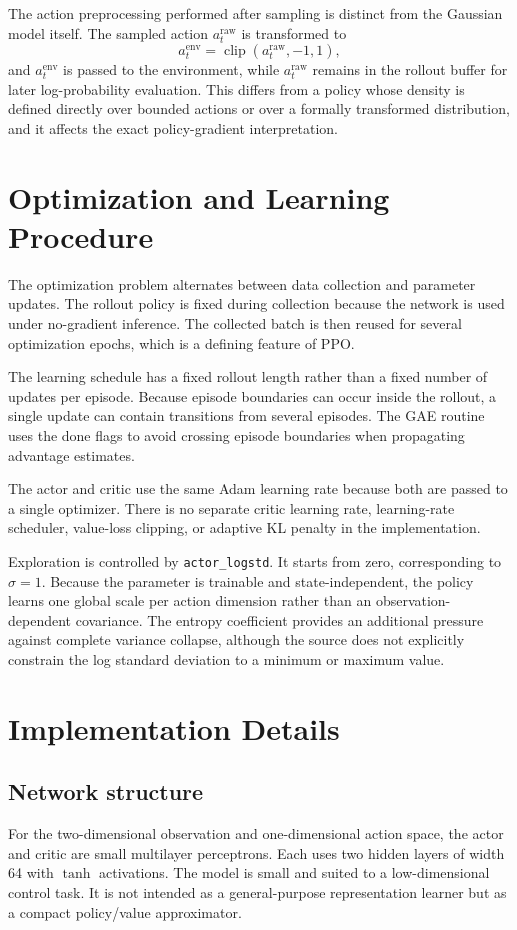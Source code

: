 \documentclass[11pt,a4paper]{article}
\begin{document}
The action preprocessing performed after sampling is distinct from the Gaussian model itself. The sampled action $a_t^{\mathrm{raw}}$ is transformed to
\begin{equation}
a_t^{\mathrm{env}}=\operatorname{clip}(a_t^{\mathrm{raw}},-1,1),
\end{equation}
and $a_t^{\mathrm{env}}$ is passed to the environment, while $a_t^{\mathrm{raw}}$ remains in the rollout buffer for later log-probability evaluation. This differs from a policy whose density is defined directly over bounded actions or over a formally transformed distribution, and it affects the exact policy-gradient interpretation.

\section{Optimization and Learning Procedure}
The optimization problem alternates between data collection and parameter updates. The rollout policy is fixed during collection because the network is used under no-gradient inference. The collected batch is then reused for several optimization epochs, which is a defining feature of PPO.

The learning schedule has a fixed rollout length rather than a fixed number of updates per episode. Because episode boundaries can occur inside the rollout, a single update can contain transitions from several episodes. The GAE routine uses the done flags to avoid crossing episode boundaries when propagating advantage estimates.

The actor and critic use the same Adam learning rate because both are passed to a single optimizer. There is no separate critic learning rate, learning-rate scheduler, value-loss clipping, or adaptive KL penalty in the implementation.

Exploration is controlled by \texttt{actor\_logstd}. It starts from zero, corresponding to $\sigma=1$. Because the parameter is trainable and state-independent, the policy learns one global scale per action dimension rather than an observation-dependent covariance. The entropy coefficient provides an additional pressure against complete variance collapse, although the source does not explicitly constrain the log standard deviation to a minimum or maximum value.

\section{Implementation Details}
\subsection{Network structure}
For the two-dimensional observation and one-dimensional action space, the actor and critic are small multilayer perceptrons. Each uses two hidden layers of width 64 with $\tanh$ activations. The model is small and suited to a low-dimensional control task. It is not intended as a general-purpose representation learner but as a compact policy/value approximator.
\end{document}
